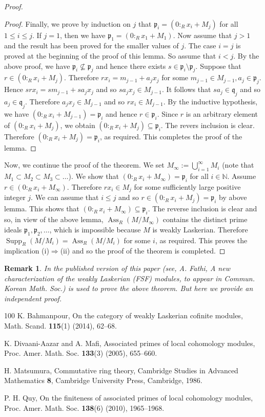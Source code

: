 \documentclass{amsart}
\newtheorem{rem}[thm]{Remark}
\theoremstyle{definition}
\numberwithin{equation}{section}
\newcommand\supp {\operatorname{Supp}}
\newcommand\ass {\operatorname{Ass}}
\newcommand\fp{\mathfrak p}
\newcommand\fq{\mathfrak q}
\newcommand\N{\mathbb N}
\begin{document}
\begin{proof}
\begin{proof}
 Finally, we prove by induction on $j$  that $\fp_i=(0:_Rx_i+M_j)$ for all $1\leq i\leq j$. If $j=1$, then we have $\fp_1=(0:_Rx_1+M_1)$. Now assume that $j>1$ and the result has been proved for the smaller values of $j$.  The case $i=j$ is proved at the beginning of the proof of this lemma. So assume  that $i<j$. By the above proof, we have $\fp_i\nsubseteq \fp_j$ and hence there exists $s\in \fp_i\setminus\fp_j$. Suppose that $r\in(0:_Rx_i+M_j)$. Therefore $rx_i=m_{j-1}+a_jx_j$ for some $m_{j-1}\in M_{j-1}, a_j\in\fp_j$. Hence
$srx_i=sm_{j-1}+sa_jx_j$ and so $sa_jx_j\in M_{j-1}$. It follows that $sa_j\in\fq_j$ and so $a_j\in\fq_j$. Therefore $a_jx_j\in M_{j-1}$ and so  $rx_i\in M_{j-1}$. By the inductive hypothesis, we have $(0:_Rx_i+M_{j-1})=\fp_i$ and hence $r\in\fp_i$. Since $r$ is an arbitrary element of $(0:_Rx_i+M_j)$, we obtain $(0:_Rx_i+M_j)\subseteq\fp_i$. The revers inclusion is clear. Therefore  $(0:_Rx_i+M_j)=\fp_i$, as required. This completes the proof of the lemma.
   \end{proof}
 Now, we continue the proof of the theorem.  We set $M_\infty:=\bigcup_{i=1}^\infty M_i$ (note that $M_1\subset M_2\subset M_3\subset \dots$). We show that $(0:_Rx_i+M_\infty)=\fp_i$ for all $i\in\N$. Assume $r\in (0:_Rx_i+M_\infty)$. Therefore $rx_i\in M_j$ for some sufficiently large positive integer $j$. We can assume that $i\leq j$ and so $r\in (0:_Rx_i+M_j)=\fp_i$ by above lemma.  This shows that $(0:_Rx_i+M_\infty)\subseteq\fp_i$. The reverse inclusion is clear and so, in view of the above lemma, $\ass_R(M/M_\infty)$ contains the distinct prime ideals $\fp_1, \fp_2, \dots$, which is impossible because $M$ is weakly Laskerian. Therefore $\supp_R(M/M_i)=\ass_R(M/M_i)$ for some $i$, as required. This proves  the implication (i)$\Rightarrow$(ii) and so the proof of the theorem is completed.
\end{proof}
\begin{rem} In the published version of this paper (see, A. Fathi, A new characterization  of the  weakly Laskerian (FSF) modules, to appear in Commun. Korean Math. Soc.) \cite[Theorem 3.3]{b} is used to prove the above theorem. But here we provide an independent proof.
\end{rem}

 \begin{thebibliography}{100}
K. Bahmanpour,
 On the category of weakly Laskerian cofinite modules,
 Math. Scand. {\bf 115}(1) (2014), 62--68.


K. Divaani-Aazar and A. Mafi,
 Associated primes of local cohomology modules,
  Proc. Amer. Math. Soc. {\bf 133}(3) (2005), 655--660.



 H. Matsumura,
  Commutative ring theory,
   Cambridge Studies in Advanced Mathematics {\bf 8}, Cambridge University Press, Cambridge, 1986.


  P. H. Quy,
   On the finiteness of associated primes of local cohomology modules,
    Proc. Amer. Math. Soc. {\bf 138}(6) (2010), 1965--1968.




\end{thebibliography}
  
\end{document}
